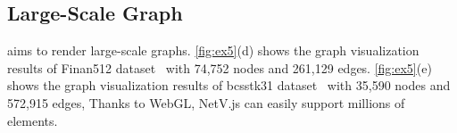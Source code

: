 
\subsection{Large-Scale Graph}
\name aims to render large-scale graphs. \autoref{fig:ex5}(d) shows the graph visualization results of Finan512 dataset~\cite{davis2011university} with 74,752 nodes and 261,129 edges. \autoref{fig:ex5}(e) shows the graph visualization results of bcsstk31 dataset~\cite{davis2011university} with 35,590 nodes and 572,915 edges,  Thanks to WebGL, NetV.js can easily support millions of elements.




